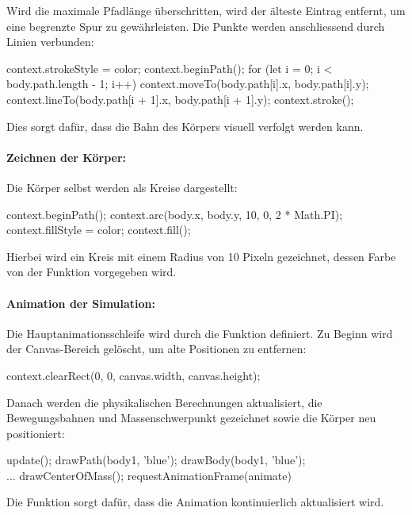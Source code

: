 \documentclass[a4paper,12pt,twoside]{article}
\begin{document}
Wird die maximale Pfadlänge überschritten, wird der älteste Eintrag entfernt, 
um eine begrenzte Spur zu gewährleisten. Die Punkte werden anschliessend durch 
Linien verbunden:

\begin{javascript}
context.strokeStyle = color;
context.beginPath();
for (let i = 0; i < body.path.length - 1; i++) {
    context.moveTo(body.path[i].x, body.path[i].y);
    context.lineTo(body.path[i + 1].x, body.path[i + 1].y);
}
context.stroke();
\end{javascript}

Dies sorgt dafür, dass die Bahn des Körpers visuell verfolgt werden kann.

\paragraph{Zeichnen der Körper:}
Die Körper selbst werden als Kreise dargestellt:

\begin{javascript}
context.beginPath();
context.arc(body.x, body.y, 10, 0, 2 * Math.PI);
context.fillStyle = color;
context.fill();
\end{javascript}

Hierbei wird ein Kreis mit einem Radius von 10 Pixeln gezeichnet, dessen Farbe 
von der Funktion vorgegeben wird.

\paragraph{Animation der Simulation:}
Die Hauptanimationsschleife wird durch die Funktion  
definiert. Zu Beginn wird der Canvas-Bereich gelöscht, um alte Positionen zu entfernen:

\begin{javascript}
context.clearRect(0, 0, canvas.width, canvas.height);
\end{javascript}

Danach werden die physikalischen Berechnungen aktualisiert, die Bewegungsbahnen und 
Massenschwerpunkt gezeichnet sowie die Körper neu positioniert:

\begin{javascript}
update();
drawPath(body1, 'blue');
drawBody(body1, 'blue');
\\...
drawCenterOfMass();
requestAnimationFrame(animate)
\end{javascript}

Die Funktion  sorgt dafür, 
dass die Animation kontinuierlich aktualisiert wird.
\end{document}
